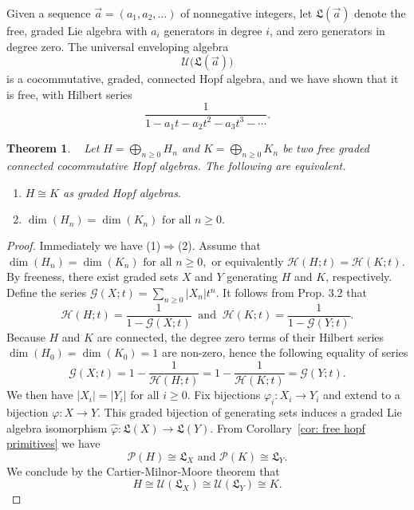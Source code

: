 \documentclass[11pt]{amsart}
\newtheorem{thm}{Theorem}
\theoremstyle{definition}
\numberwithin{equation}{section}
\begin{document}
Given a sequence $\vec{a} = (a_{1}, a_{2}, \ldots)$ of nonnegative integers, let $\mathfrak{L}(\vec{a})$ denote the free, graded Lie algebra with $a_{i}$ generators in degree $i$, and zero generators in degree zero.  The universal enveloping algebra
\[
\mathcal{U}\big(\mathfrak{L}(\vec{a})\big)
\]
is a cocommutative, graded, connected Hopf algebra, and we have shown that it is free, with Hilbert series
\[
\frac{1}{1 - a_{1}t - a_{2}t^{2} - a_{3}t^{3} - \cdots}.
\]

\begin{thm}~\cite[Theorem 4.2]{AT22}
Let $H=\bigoplus_{n\geq 0} H_n$ and $K=\bigoplus_{n\geq 0} K_n$ be two free graded connected cocommutative Hopf algebras. The following are equivalent.
\begin{enumerate}
\item $H\cong K$ as graded Hopf algebras. 

\item $\dim(H_n)=\dim(K_n) \text{ for all } n\geq 0.$
\end{enumerate}   
\end{thm}

\begin{proof}
Immediately we have (1)$\Rightarrow$(2). Assume that $\dim(H_n)=\dim(K_n) \text{ for all } n\geq 0,$ or equivalently $\mathcal{H}(H;t)=\mathcal{H}(K;t).$ By freeness, there exist graded sets $X$ and $Y$ generating $H$ and $K$, respectively. Define the series $\mathcal{G}(X;t)=\sum_{n\geq 0}|X_n|t^n$. It follows from Prop. 3.2 that
\[
\mathcal{H}(H;t)=\frac{1}{1-\mathcal{G}(X;t)}\ \text{  and  }\ \mathcal{H}(K;t)=\frac{1}{1-\mathcal{G}(Y;t)}.
\]
Because $H$ and $K$ are connected, the degree zero terms of their Hilbert series $\dim(H_0)=\dim(K_0)=1$ are non-zero, hence the following equality of series
\[
\mathcal{G}(X;t)=1-\frac{1}{\mathcal{H}(H;t)}=1-\frac{1}{\mathcal{H}(K;t)}=\mathcal{G}(Y;t).
\]
We then have $|X_i|=|Y_i|$ for all $i\geq 0.$ Fix bijections $\varphi_i:X_i\to Y_i$ and extend to a bijection $\varphi:X\to Y$. This graded bijection of generating sets induces a graded Lie algebra isomorphism $\hat{\varphi}:\mathfrak{L}(X)\to \mathfrak{L}(Y)$. From Corollary~\ref{cor: free hopf primitives} we have 
\[
\mathcal{P}(H)\cong \mathfrak{L}_X \text{ and } \mathcal{P}(K)\cong \mathfrak{L}_Y.
\]
We conclude by the Cartier-Milnor-Moore theorem that
\[
H\cong \mathcal{U}(\mathfrak{L}_X)\cong \mathcal{U}(\mathfrak{L}_Y)\cong K.
\]
\end{proof}
\end{document}

